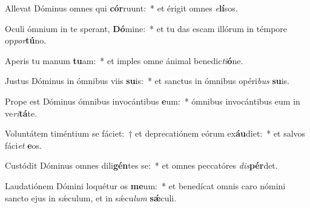 \item Allevat Dóminus omnes qui \textbf{cór}ruunt:~* et érigit omnes \textit{e}\textbf{lí}sos.
\item Oculi ómnium in te sperant, \textbf{Dó}mine:~* et tu das escam illórum in témpore op\textit{por}\textbf{tú}no.
\item Aperis tu manum \textbf{tu}am:~* et imples omne ánimal benedic\textit{ti}\textbf{ó}ne.
\item Justus Dóminus in ómnibus viis \textbf{su}is:~* et sanctus in ómnibus opéri\textit{bus} \textbf{su}is.
\item Prope est Dóminus ómnibus invocántibus \textbf{e}um:~* ómnibus invocántibus eum in ve\textit{ri}\textbf{tá}te.
\item Voluntátem timéntium se fáciet:~† et deprecatiónem eórum ex\textbf{áu}diet:~* et salvos fáci\textit{et} \textbf{e}os.
\item Custódit Dóminus omnes dili\textbf{gén}tes se:~* et omnes peccatóres \textit{dis}\textbf{pér}det.
\item Laudatiónem Dómini loquétur os \textbf{me}um:~* et benedícat omnis caro nómini sancto ejus in sǽculum, et in sǽcu\textit{lum} \textbf{sǽ}culi.
